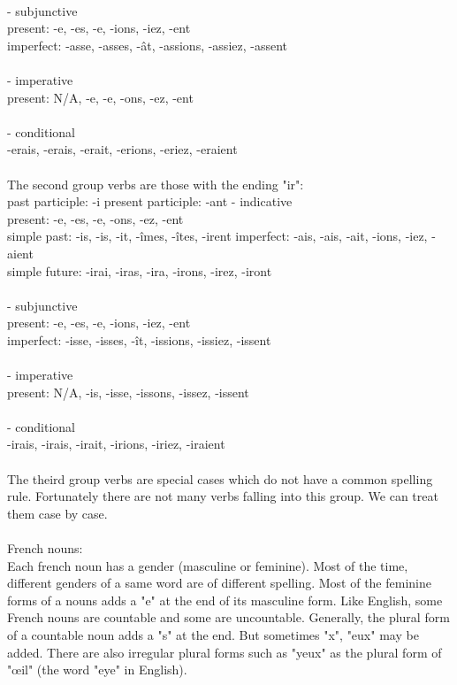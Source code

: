 \documentclass[11pt,letterpaper]{article}
\begin{document}
\\
\indent - subjunctive\\
\indent\indent present: -e, -es, -e, -ions, -iez, -ent\\
\indent\indent imperfect: -asse, -asses, -\^at, -assions, -assiez, -assent\\
\\
\indent - imperative\\
\indent\indent present: N/A, -e, -e, -ons, -ez, -ent\\
\\
\indent - conditional\\
\indent\indent -erais, -erais, -erait, -erions, -eriez, -eraient\\
\\
\indent The second group verbs are those with the ending "ir":\\
\indent past participle: -i
\indent present participle: -ant
\indent - indicative\\
\indent\indent present: -e, -es, -e, -ons, -ez, -ent\\
\indent\indent simple past: -is, -is, -it, -\^imes, -\^ites, -irent
\indent\indent imperfect: -ais, -ais, -ait, -ions, -iez, -aient\\
\indent\indent simple future: -irai, -iras, -ira, -irons, -irez, -iront\\
\\
\indent - subjunctive\\
\indent\indent present: -e, -es, -e, -ions, -iez, -ent\\
\indent\indent imperfect: -isse, -isses, -\^it, -issions, -issiez, -issent\\
\\
\indent - imperative\\
\indent\indent present: N/A, -is, -isse, -issons, -issez, -issent\\
\\
\indent - conditional\\
\indent\indent -irais, -irais, -irait, -irions, -iriez, -iraient\\
\\
\indent The theird group verbs are special cases which do not have a common spelling rule. Fortunately there are not many verbs falling into this group. We can treat them case by case.\\
\\
French nouns:\\
Each french noun has a gender (masculine or feminine). Most of the time, different genders of a same word are of different spelling. Most of the feminine forms of a nouns adds a "e" at the end of its masculine form. Like English, some French nouns are countable and some are uncountable. Generally, the plural form of a countable noun adds a "s" at the end. But sometimes "x", "eux" may be added. There are also irregular plural forms such as "yeux" as the plural form of "\oe il" (the word "eye" in English).\\
\end{document}
